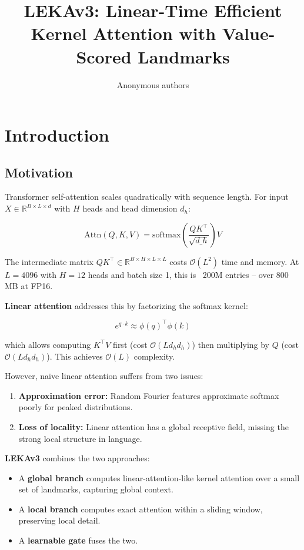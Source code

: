 \title{\textbf{LEKAv3: Linear-Time Efficient Kernel Attention with Value-Scored Landmarks}}

\author{Anonymous authors}


\section{Introduction}

\subsection{Motivation}

Transformer self-attention scales quadratically with sequence length. For 
input $X \in \mathbb{R}^{B \times L \times d}$ with $H$ heads and head 
dimension $d_h$:

\[
\text{Attn}(Q, K, V) = \text{softmax}\!\left(\frac{Q K^\top}{\sqrt{d\_h}}\right) V
\tag{1.1}
\]

The intermediate matrix $QK^\top \in \mathbb{R}^{B \times H \times L \times L}$ 
costs $\mathcal{O}(L^2)$ time and memory. At $L = 4096$ with $H = 12$ heads 
and batch size 1, this is ~200M entries -- over 800 MB at FP16.

\textbf{Linear attention} addresses this by factorizing the softmax kernel:

\[
e^{q \cdot k} \approx \phi(q)^\top \phi(k)
\tag{1.2}
\]

which allows computing $K^\top V$ first (cost $\mathcal{O}(L d_h d_h)$) then 
multiplying by $Q$ (cost $\mathcal{O}(L d_h d_h)$). This achieves $\mathcal{O}(L)$ 
complexity.

However, naive linear attention suffers from two issues:

\begin{enumerate}
\item \textbf{Approximation error:} Random Fourier features approximate softmax poorly
  for peaked distributions.
\item \textbf{Loss of locality:} Linear attention has a global receptive field, missing
  the strong local structure in language.

\end{enumerate}
\textbf{LEKAv3} combines the two approaches:

\begin{itemize}
\item A \textbf{global branch} computes linear-attention-like kernel attention over
  a small set of landmarks, capturing global context.
\item A \textbf{local branch} computes exact attention within a sliding window,
  preserving local detail.
\item A \textbf{learnable gate} fuses the two.

\end{itemize}
